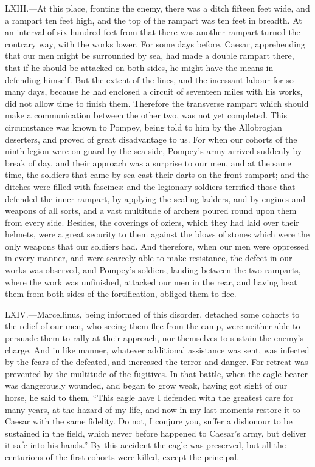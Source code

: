 LXIII.—At this place, fronting the enemy, there was a ditch fifteen
feet wide, and a rampart ten feet high, and the top of the rampart was
ten feet in breadth. At an interval of six hundred feet from that there
was another rampart turned the contrary way, with the works lower. For
some days before, Caesar, apprehending that our men might be surrounded
by sea, had made a double rampart there, that if he should be attacked
on both sides, he might have the means in defending himself. But the
extent of the lines, and the incessant labour for so many days, because
he had enclosed a circuit of seventeen miles with his works, did not
allow time to finish them. Therefore the transverse rampart which should
make a communication between the other two, was not yet completed. This
circumstance was known to Pompey, being told to him by the Allobrogian
deserters, and proved of great disadvantage to us. For when our cohorts
of the ninth legion were on guard by the sea-side, Pompey's army arrived
suddenly by break of day, and their approach was a surprise to our men,
and at the same time, the soldiers that came by sea cast their darts on
the front rampart; and the ditches were filled with fascines: and the
legionary soldiers terrified those that defended the inner rampart, by
applying the scaling ladders, and by engines and weapons of all sorts,
and a vast multitude of archers poured round upon them from every side.
Besides, the coverings of oziers, which they had laid over their
helmets, were a great security to them against the blows of stones which
were the only weapons that our soldiers had. And therefore, when our men
were oppressed in every manner, and were scarcely able to make
resistance, the defect in our works was observed, and Pompey's soldiers,
landing between the two ramparts, where the work was unfinished,
attacked our men in the rear, and having beat them from both sides of
the fortification, obliged them to flee.

LXIV.—Marcellinus, being informed of this disorder, detached some
cohorts to the relief of our men, who seeing them flee from the camp,
were neither able to persuade them to rally at their approach, nor
themselves to sustain the enemy's charge. And in like manner, whatever
additional assistance was sent, was infected by the fears of the
defeated, and increased the terror and danger. For retreat was prevented
by the multitude of the fugitives. In that battle, when the eagle-bearer
was dangerously wounded, and began to grow weak, having got sight of our
horse, he said to them, ``This eagle have I defended with the greatest
care for many years, at the hazard of my life, and now in my last
moments restore it to Caesar with the same fidelity. Do not, I conjure
you, suffer a dishonour to be sustained in the field, which never before
happened to Caesar's army, but deliver it safe into his hands.'' By this
accident the eagle was preserved, but all the centurions of the first
cohorts were killed, except the principal.

